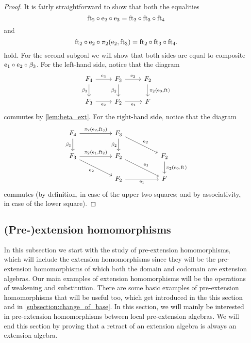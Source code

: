 \begin{proof}
\begin{comment}
  & =
\pullbackpr{2}{\ectxext}{\eft}\circ\eext{2}\circ\pullbackpr{2}{\eext{2}}{\eft[3]}.
\end{align*}
\end{comment}
It is fairly straightforward to show that both the equalities
\begin{equation*}
\eft[2]\circ\eext{2}\circ\eext{3}
  =
\eft[2]\circ\eft[3]\circ\eft[4]
\end{equation*}
and
\begin{equation*}
\eft[2]\circ\eext{2}\circ\pullbackpr{2}{\eext{2}}{\eft[3]}
  =
\eft[2]\circ\eft[3]\circ\eft[4].
\end{equation*}
hold. For the second subgoal we will show that both sides are equal to 
composite $\eext{1}\circ\eext{2}\circ\beta_3$. For the left-hand side, notice that 
the diagram
\begin{equation*}
\begin{tikzcd}
\stesysf_4
  \ar{r}{\eext{3}}
  \ar{d}[swap]{\beta_3}
  &
\stesysf_3
  \ar{r}{\eext{2}}
  \ar{d}[swap]{\beta_2}
  &
\stesysf_2
  \ar{d}{\pullbackpr{2}{\ectxext}{\eft}}
  \\
\stesysf_3
  \ar{r}[swap]{\eext{2}}
  &
\stesysf_2
  \ar{r}[swap]{\efamext}
  &
\stesysf
\end{tikzcd}
\end{equation*}
commutes by \autoref{lem:beta_ext}. For the right-hand side, notice that the
diagram
\begin{equation*}
\begin{tikzcd}[column sep=huge]
\stesysf_4
  \ar{r}{\pullbackpr{2}{\eext{2}}{\eft[3]}}
  \ar{d}[swap]{\beta_3}
  &
\stesysf_3
  \ar{dr}{\eext{2}}
  \ar{d}[swap]{\beta_2}
  \\
\stesysf_3
  \ar{r}{\pullbackpr{2}{\efamext}{\eft[2]}}
  \ar{dr}[swap]{\eext{2}}
  &
\stesysf_2
  \ar{dr}{\efamext}
  &
\stesysf_2
  \ar{d}{\pullbackpr{2}{\ectxext}{\eft}}
  \\
  {} &
\stesysf_2
  \ar{r}[swap]{\efamext}
  &
\stesysf
\end{tikzcd}
\end{equation*}
commutes (by definition, in case of the upper two squares; and by associativity,
in case of the lower square).
\end{proof}

\subsection{(Pre-)extension homomorphisms}\label{subsection:e_extension_homomorphisms}
In this subsection we start with the study of pre-extension homomorphisms, which
will include the extension homomorphisms since they will be the pre-extension
homomorphisms of which both the domain and codomain are extension algebras.
Our main examples of extension homomorphisms will be the operations of weakening
and substitution. There are some basic examples of pre-extension homomorphisms
that will be useful too, which get introduced in the this section and in
\autoref{subsection:change_of_base}. In this section, we will mainly be
interested in pre-extension homomorphisms between local pre-extension algebras.
We will end this section by proving that a retract of an extension algebra is
always an extension algebra.

